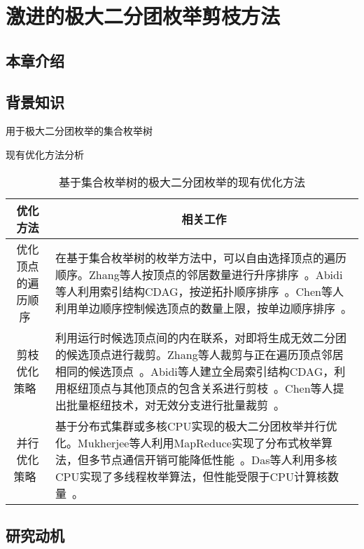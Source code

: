 \chapter{激进的极大二分团枚举剪枝方法}
\label{ch:aggressive_mbe}

\section{本章介绍}
\section{背景知识}
\label{sec:opt}

用于极大二分团枚举的集合枚举树

现有优化方法分析


\begin{table} 

  \caption{基于集合枚举树的极大二分团枚举的现有优化方法}
  \label{tbl:sota}
  \centering
  
  \begin{tabular}{|c|p{10cm}|}\toprule
    \hline
    \textbf{优化方法} & \multicolumn{1}{c|}{\textbf{相关工作}} \\ \hline
优化顶点的遍历顺序~\cite{iMBEA14,PMBE20,ooMBE22} & 在基于集合枚举树的枚举方法中，可以自由选择顶点的遍历顺序。Zhang等人按顶点的邻居数量进行升序排序~\cite{iMBEA14}。Abidi等人利用索引结构CDAG，按逆拓扑顺序排序~\cite{PMBE20}。Chen等人利用单边顺序控制候选顶点的数量上限，按单边顺序排序~\cite{ooMBE22}。\\ \hline
剪枝优化策略~\cite{iMBEA14,PMBE20,ooMBE22} & 利用运行时候选顶点间的内在联系，对即将生成无效二分团的候选顶点进行裁剪。Zhang等人裁剪与正在遍历顶点邻居相同的候选顶点~\cite{iMBEA14}。Abidi等人建立全局索引结构CDAG，利用枢纽顶点与其他顶点的包含关系进行剪枝~\cite{PMBE20}。Chen等人提出批量枢纽技术，对无效分支进行批量裁剪~\cite{ooMBE22}。\\ \hline
并行优化策略~\cite{mapreduceMBE16,parMBE18} & 基于分布式集群或多核CPU实现的极大二分团枚举并行优化。Mukherjee等人利用MapReduce实现了分布式枚举算法，但多节点通信开销可能降低性能~\cite{mapreduceMBE16}。Das等人利用多核CPU实现了多线程枚举算法，但性能受限于CPU计算核数量~\cite{parMBE18}。 \\ \hline

  \end{tabular}
    
\end{table}


\section{研究动机}

